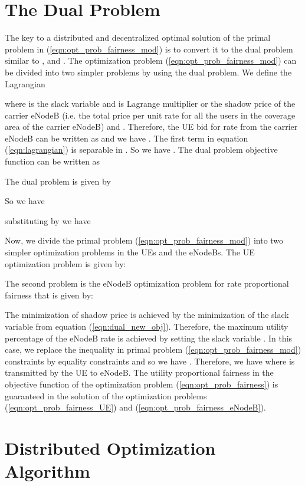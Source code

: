 \documentclass[journal]{IEEEtran} 		\usepackage{amsmath,amssymb}
\begin{document}
\section{The Dual Problem}\label{sec:Dual}

The key to a distributed and decentralized optimal solution of the primal problem in (\ref{eqn:opt_prob_fairness_mod}) is to convert it to the dual problem similar to \cite{Ahmed_Utility1}, \cite{kelly98ratecontrol} and \cite{Low99optimizationflow}. The optimization problem (\ref{eqn:opt_prob_fairness_mod}) can be divided into two simpler problems by using the dual problem.  We define the Lagrangian

where  is the  slack variable and  is Lagrange multiplier or the shadow price of the  carrier eNodeB (i.e. the total price per unit rate for all the users in the coverage area of the  carrier eNodeB) and . Therefore, the  UE bid for rate from the  carrier eNodeB can be written as  and we have . The first term in equation (\ref{eqn:lagrangian}) is separable in . So we have .
The dual problem objective function can be written as

The dual problem is given by

So we have

substituting by  we have

Now, we divide the primal problem (\ref{eqn:opt_prob_fairness_mod}) into two simpler optimization problems in the UEs and the eNodeBs. The  UE optimization problem is given by:


The second problem is the  eNodeB optimization problem for rate proportional fairness that is given by:

The minimization of shadow price  is achieved by the minimization of the slack variable  from equation (\ref{eqn:dual_new_obj}). Therefore, the maximum utility percentage of the  eNodeB rate  is achieved by setting the slack variable . In this case, we replace the inequality in primal problem (\ref{eqn:opt_prob_fairness_mod}) constraints by  equality constraints and so we have . Therefore, we have  where  is transmitted by the  UE to  eNodeB. The utility proportional fairness in the objective function of the optimization problem (\ref{eqn:opt_prob_fairness}) is guaranteed in the solution of the optimization problems (\ref{eqn:opt_prob_fairness_UE}) and (\ref{eqn:opt_prob_fairness_eNodeB}).


\section{Distributed Optimization Algorithm}\label{sec:Algorithm}
\end{document}
